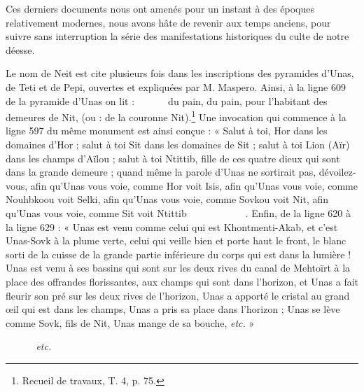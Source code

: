 \documentclass[a4paper, 11pt, oneside]{article}
\newcommand*\hieroAAAG{}
\newcommand*\hieroAAAH{}
\newcommand*\hieroAAAI{}
\newcommand*\hieroAAAO{}
\newcommand*\hieroAAAQ{}
\newcommand*\hieroAABR{}
\newcommand*\hieroAABS{}
\newcommand*\hieroAACD{}
\newcommand*\hieroAACO{}
\newcommand*\hieroAACS{}
\newcommand*\hieroAADL{}
\newcommand*\hieroAAEP{\raisebox{0.5ex}{}}
\newcommand*\hieroAAES{\raisebox{0.5ex}{}}
\newcommand*\hieroAAFD{}
\newcommand*\hieroAAHA{}
\newcommand*\hieroAAIS{}
\newcommand*\hieroAAQC{}
\newcommand*\hieroAATP{}
\newcommand*\hieroAATQ{}
\newcommand*\hieroAATR{}
\newcommand*\hieroAATS{}
\newcommand*\hieroAATT{}
\newcommand*\hieroAATU{}
\newcommand*\hieroAATV{\raisebox{0.3ex}{}}
\newcommand*\hieroAATW{}
\newcommand*\hieroAATX{}
\newcommand*\hieroAATY{}
\newcommand*\hieroAATZ{}
\begin{document}
Ces derniers documents nous ont amenés pour un instant à des époques relativement modernes, nous avons hâte de revenir aux temps anciens, pour suivre sans interruption la série des manifestations historiques du culte de notre déesse.

Le nom de Neit est cite plusieurs fois dans les inscriptions des pyramides d'Unas, de Teti et de Pepi, ouvertes et expliquées par M. Maspero. Ainsi, à la ligne 609 de la pyramide d'Unas on lit : $\hieroAADL\:\hieroAAAG\:\hieroAATP\allowbreak\:\hieroAADL\:\hieroAAAG\:\hieroAAAG\allowbreak\:\hieroAATP\:\hieroAAEP\:\hieroAAHA\allowbreak\:\hieroAACD\:\hieroAAHA\allowbreak\:\hieroAAAQ\:\hieroAAQC$ du pain, du pain, pour l'habitant des demeures de Nit, (ou : de la couronne Nit).\footnote{Recueil de travaux, T. 4, p. 75.} Une invocation qui commence à la ligne 597 du même monument est ainsi conçue : « Salut à toi, Hor dans les domaines d'Hor ; salut à toi Sit dans les domaines de Sit ; salut à toi Lion (Aïr) dans les champs d'Aïlou ; salut à toi Ntittib, fille de ces quatre dieux qui sont dans la grande demeure ; quand même la parole d'Unas ne sortirait pas, dévoilez-vous, afin qu'Unas vous voie, comme Hor voit Isis, afin qu'Unas vous voie, comme Nouhbkoou voit Selki, afin qu'Unas vous voie, comme Sovkou voit Nit, afin qu'Unas vous voie, comme Sit voit Ntittib $\hieroAATQ\:\hieroAAAG\:\hieroAATR\allowbreak\:\hieroAABS\:\hieroAACO\:\hieroAAIS\:\hieroAATQ\:\hieroAAAG\:\hieroAAAG\allowbreak\:\hieroAATS\:\hieroAAAO\:\hieroAATQ\:\hieroAAAG\:\hieroAATR\:\hieroAABS\allowbreak\:\hieroAACO\:\hieroAAIS\:\hieroAAEP\:\hieroAATQ\:\hieroAAAG\:\hieroAAAG\allowbreak\:\hieroAATT\:\hieroAATU\:\hieroAACD\allowbreak\:\hieroAAAH\:\hieroAATV$. Enfin, de la ligne 620 à la ligne 629 : « Unas est venu comme celui qui est Khontmenti-Akab, et c'est Unas-Sovk à la plume verte, celui qui veille bien et porte haut le front, le blanc sorti de la cuisse de la grande partie inférieure du corps qui est dans la lumière ! Unas est venu à ses bassins qui sont sur les deux rives du canal de Mehtoïrt à la place des offrandes florissantes, aux champs qui sont dans l'horizon, et Unas a fait fleurir son pré sur les deux rives de l'horizon, Unas a apporté le cristal au grand œil qui est dans les champs, Unas a pris sa place dans l'horizon ; Unas se lève comme Sovk, fils de Nit, Unas mange de sa bouche, \emph{etc.} »

$\hieroAATW\:\hieroAACO\:\hieroAABR\allowbreak\:\hieroAACS\:\hieroAAFD\:\hieroAAES\allowbreak\:\hieroAAAI\:\hieroAAAQ\:\hieroAATX\allowbreak\:\hieroAATY\:\hieroAACO\allowbreak\:\hieroAABR\:\hieroAATZ$ \emph{etc.}
\end{document}
